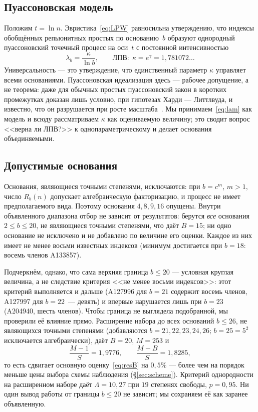 \documentclass[11pt,a4paper]{article}
\theoremstyle{plain}
\theoremstyle{remark}
\newcommand{\Rb}{R_b}
\newcommand{\eg}{e^{\gamma}}
\begin{document}
\subsection{Пуассоновская модель}
Положим $t=\ln n$. Эвристика~\eqref{eq:LPW} равносильна утверждению, что индексы
обобщённых репьюнитных простых по основанию~$b$ образуют однородный пуассоновский
точечный процесс на оси~$t$ с постоянной интенсивностью
\begin{equation}\label{eq:lam}
\lambda_b=\frac{\kappa}{\ln b},\qquad \text{ЛПВ:}\ \ \kappa=\eg=1{,}781072\ldots
\end{equation}
Универсальность --- это утверждение, что единственный параметр $\kappa$ управляет всеми
основаниями. Пуассоновская идеализация здесь --- рабочее допущение, а не теорема:
даже для обычных простых пуассоновский закон в коротких промежутках доказан лишь
условно, при гипотезах Харди --- Литтлвуда, и известно, что он разрушается при росте
масштаба~\cite{jha2026}. Мы принимаем~\eqref{eq:lam} как модель и всюду рассматриваем
$\kappa$ как оцениваемую величину; это сводит вопрос <<верна ли ЛПВ?>> к однопараметрическому и
делает основания объединяемыми.

\subsection{Допустимые основания}\label{sec:bases}
Основания, являющиеся точными степенями, исключаются: при $b=c^{m}$, $m>1$, число
$\Rb(n)$ допускает алгебраическую факторизацию, и процесс не имеет предполагаемого вида.
Поэтому основания $4,8,9,16$ опущены. Внутри объявленного диапазона отбор
не зависит от результатов: берутся \emph{все} основания $2\le b\le20$, не являющиеся
точными степенями, что даёт $B=15$; ни одно основание не исключено и не добавлено
по величине его оценки. Каждое из них имеет не менее восьми известных индексов
(минимум достигается при $b=18$: восемь членов A133857).

Подчеркнём, однако, что сама верхняя граница $b\le20$ --- условная круглая величина,
а не следствие критерия <<не менее восьми индексов>>: этот критерий выполняется и
дальше (A127996 для $b=21$ содержит восемь членов, A127997 для $b=22$~--- девять) и
впервые нарушается лишь при $b=23$ (A204940, шесть членов). Чтобы граница не выглядела
подобранной, мы проверили её влияние прямо. Расширение набора до всех оснований
$b\le26$, не являющихся точными степенями (добавляются $b=21,22,23,24,26$; $b=25=5^2$
исключается алгебраически), даёт $B=20$, $M=253$ и
\[
  \frac{M-1}{S}=1{,}9776,\qquad \frac{M-B}{S}=1{,}8285,
\]
то есть сдвигает основную оценку~\eqref{eq:resB} на $0{,}5\%$ --- более чем на
порядок меньше цены выбора схемы наблюдения (\S\ref{sec:scheme}). Критерий однородности на расширенном
наборе даёт $\Lambda=10{,}27$ при $19$ степенях свободы, $p=0{,}95$. Ни один вывод
работы от границы $b\le20$ не зависит; мы сохраняем её как заранее объявленную.
\end{document}
